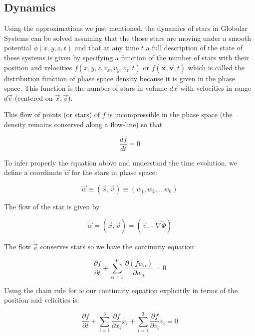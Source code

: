 \subsection{Dynamics}

Using the approximations we just mentioned, the dynamics of stars in Globular Systems can be solved assuming that the those stars are moving under a smooth potential $\phi (x,y,z,t)$ and that at any time $t$ a full description of the state of these systems is given by specifying a function of the number of stars with their position and velocities $f(x,y,z,v_{x},v_{y},v_{z},t)$ or $f(\vec{\textbf{x}},\vec{\textbf{v}},t)$ which is called the distribution function of phase space density because it is given in the phase space. This function is the number of stars in volume $d\vec{x}$ with velocities in range $d\vec{v}$ (centered on $\vec{x},\vec{v}$).

This flow of points (or stars) of $f$ is incompressible in the phase space (the density remains conserved along a flow-line) so that

\begin{equation}
\frac{df}{dt}=0
\end{equation}

To infer properly the equation above and understand the time evolution, we define a coordinate $\vec{w}$ for the stars in phase space:

\begin{equation}
\vec{w}\equiv (\vec{x},\vec{v})\equiv (w_{1},w_{2},...w_{6})
\end{equation}

The flow of the star is given by 

\begin{equation}
\dot{\vec{w}}= (\dot{\vec{x}},\dot{\vec{v}})=(\vec{v},-\vec{\nabla} \Phi)
\end{equation}

The flow $\dot{\vec{v}}$ conserves stars so we have the continuity equation:

\begin{equation}
\frac{\partial f}{\partial t}+\sum_{\alpha=1}^{6}\frac{\partial (f\dot{w}_{\alpha})}{\partial w_{\alpha}}=0
\end{equation}

Using the chain rule for $w$ our continuity equation explicitily in terms of the position and velicities is:

\begin{equation}
\frac{\partial f}{\partial t}+\sum_{i=1}^{3}\frac{\partial f}{\partial x_{i}}\dot{x_{i}}+\sum_{i=1}^{3}\frac{\partial f}{\partial v_{i}}\dot{v_{i}}=0
\end{equation}

